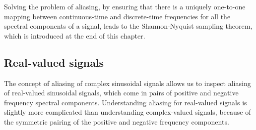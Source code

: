 Solving the problem of aliasing, by ensuring that there is a uniquely one-to-one mapping between continuous-time and discrete-time frequencies 
for all the spectral components of a signal, leads to the Shannon-Nyquist sampling theorem, which is introduced at the end of this chapter.

\subsection{Real-valued signals}
The concept of aliasing of complex sinusoidal signals allows us to inspect aliasing of real-valued sinusoidal signals, which come in pairs of positive and negative frequency spectral components. 
Understanding aliasing for real-valued signals is slightly more complicated than understanding complex-valued signals, because of the symmetric pairing of the positive and negative frequency components.

